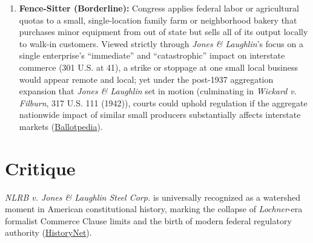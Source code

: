 \documentclass[12pt]{article}
\begin{document}
\begin{enumerate}
\item \textbf{Fence-Sitter (Borderline):} Congress applies federal labor or agricultural quotas to a small, single-location family farm or neighborhood bakery that purchases minor equipment from out of state but sells all of its output locally to walk-in customers. Viewed strictly through \textit{Jones \& Laughlin}'s focus on a single enterprise's ``immediate'' and ``catastrophic'' impact on interstate commerce (301 U.S. at 41), a strike or stoppage at one small local business would appear remote and local; yet under the post-1937 aggregation expansion that \textit{Jones \& Laughlin} set in motion (culminating in \textit{Wickard v. Filburn}, 317 U.S. 111 (1942)), courts could uphold regulation if the aggregate nationwide impact of similar small producers substantially affects interstate markets (\href{https://ballotpedia.org/National_Labor_Relations_Board_v._Jones_\%26_Laughlin_Steel_Corporation}{Ballotpedia}).
\end{enumerate}

\section{Critique}

\textit{NLRB v. Jones \& Laughlin Steel Corp.} is universally recognized as a watershed moment in American constitutional history, marking the collapse of \textit{Lochner}-era formalist Commerce Clause limits and the birth of modern federal regulatory authority (\href{https://historynet.com/1937-labor-board-case-upheld-workers-right-to-organize/}{HistoryNet}).
\end{document}
